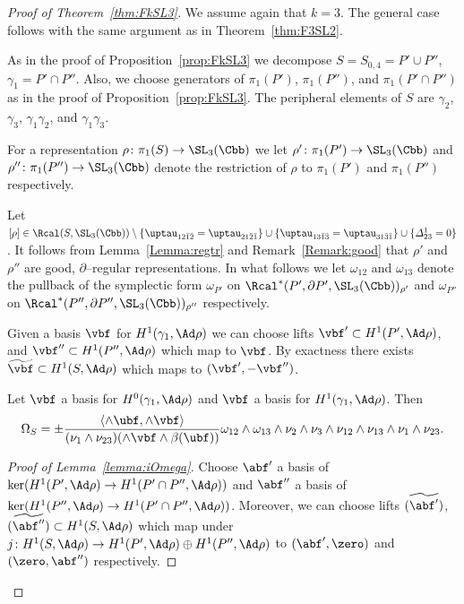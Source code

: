 \begin{proof}[Proof of Theorem~\ref{thm:FkSL3}]
We assume again that $k=3$. The general case follows with the same argument as in Theorem~\ref{thm:F3SL2}.


As in the proof of Proposition~\ref{prop:FkSL3} we decompose $S=S_{0,4} = P'\cup P''$, $\gamma_1 = P'\cap P''$. Also, we choose generators of $\pi_1(P')$, $\pi_1(P'')$, and $\pi_1(P'\cap P'')$ as in the proof of Proposition~\ref{prop:FkSL3}. The peripheral elements of $S$ are $\gamma_2$, $\gamma_3$, $\gamma_1\gamma_2$, and $\gamma_1\gamma_3$.


For a representation $\rho\colon\pi_1(S)\to\SL_3(\Cbb)$ we let $\rho'\colon\pi_1(P')\to\SL_3(\Cbb)$ and\linebreak $\rho''\colon\pi_1(P'')\to\SL_3(\Cbb)$ denote the restriction of $\rho$ to $\pi_1(P')$ and $\pi_1(P'')$ respectively.


Let $[\rho]\in\Rcal(S,\SL_3(\Cbb))\setminus \{ \uptau_{12\bar 1\bar{2}}= \uptau_{21\bar 2\bar 1} \}\cup
\{ \uptau_{13\bar 1\bar{3}}= \uptau_{31\bar 3\bar 1} \} \cup\{
\varDelta^1_{23} = 0\} $. It follows from Lemma~\ref{Lemma:regtr} and Remark~\ref{Remark:good} that $\rho'$ and $\rho''$ are good, $\partial$--regular representations. In what follows we let $\omega_{12}$ and $\omega_{13}$ denote the pullback of the symplectic form $\omega_{P'}$ on $\Rcal^*(P',\partial P',\SL_3(\Cbb))_{\rho'}$ and $\omega_{P''}$ on $\Rcal^*(P'',\partial P'',\SL_3(\Cbb))_{\rho''}$ respectively.


Given a basis $\vbf$ for $H^1(\gamma_1,\Ad\rho) $ we can choose lifts $\vbf'\subset H^1(P',\Ad\rho) $, and $\vbf''\subset H^1(P'',\Ad\rho) $ which map to $\vbf$. By exactness there exists $\widetilde{\vbf}\subset H^1(S,\Ad\rho)$ which maps to $(\vbf',-\vbf'')$.

\goodbreak

\begin{lemm}\label{lemma:iOmega}
Let $\vbf$ a basis for $H^0(\gamma_1,\Ad\rho) $ and $\vbf$ a basis for $H^1(\gamma_1,\Ad\rho) $. Then
\begin{equation}\label{mult:OmegaS}
\Omega_S =\pm
\frac{\langle \wedge\ubf, \wedge\vbf \rangle }{(\nu_1 \wedge \nu_{23}) (\wedge\vbf\wedge\beta(\ubf)) }
\omega_{12}\wedge \omega_{13} \wedge\nu_2
\wedge\nu_3\wedge\nu_{12}\wedge\nu_{13} \wedge \nu_1\wedge \nu_{23}.
\end{equation}
\end{lemm}

\begin{proof}[Proof of Lemma~\ref{lemma:iOmega}]
Choose $\abf'$ a basis of $\ker (H^1(P',\Ad\rho)\to H^1(P'\cap P'',\Ad\rho))$ and $\abf''$ a basis of $\ker (H^1(P'',\Ad\rho)\to H^1(P'\cap P'',\Ad\rho))$. Moreover, we can choose lifts $\widetilde{(\abf')}$, $\widetilde{(\abf'')}\subset H^1(S,\Ad\rho)$ which map under $j\colon H^1(S,\Ad\rho) \to H^1(P',\Ad\rho)\oplus H^1(P'',\Ad\rho)$ to $(\abf',\zero)$ and $(\zero,\abf'')$ respectively.




\end{proof}
\end{proof}

